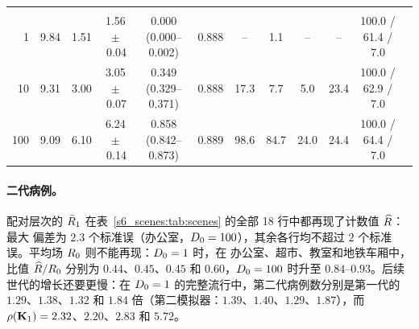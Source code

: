 \begin{table}[tbp]
\begin{tabular}{@{}rccccccccccc@{}}
\addlinespace
\multicolumn{12}{@{}l}{\emph{地铁车厢}，$\Npop=310$，$\ncell=270$，同格接触核；$\beta\langle q\rangle/\gamma=9.06$，$\beta\qmax/\gamma=10.00$}\\
1 & 9.84 & 1.51 & 1.56\,$\pm$\,0.04 & 0.000 (0.000--0.002) & 0.888 & -- & 1.1 & -- & -- & 100.0 / 61.4 / 7.0 & \\
10 & 9.31 & 3.00 & 3.05\,$\pm$\,0.07 & 0.349 (0.329--0.371) & 0.888 & 17.3 & 7.7 & 5.0 & 23.4 & 100.0 / 62.9 / 7.0 & \\
100 & 9.09 & 6.10 & 6.24\,$\pm$\,0.14 & 0.858 (0.842--0.873) & 0.889 & 98.6 & 84.7 & 24.0 & 24.4 & 100.0 / 64.4 / 7.0 & \\
\bottomrule
\end{tabular}
\end{table}

\paragraph{二代病例。}配对层次的 $\bar{R}_1$ 在表~\ref{s6_scenes:tab:scenes} 的全部 18 行中都再现了计数值 $\widehat{R}$：最大
偏差为 $2.3$ 个标准误（办公室，$D_0=100$），其余各行均不超过 $2$ 个标准误。平均场 $R_0$ 则不能再现：$D_0=1$ 时，在
办公室、超市、教室和地铁车厢中，比值 $\widehat{R}/R_0$ 分别为 $0.44$、$0.45$、$0.45$ 和 $0.60$，$D_0=100$ 时升至
$0.84$--$0.93$。后续世代的增长还要更慢：在 $D_0=1$ 的完整流行中，第二代病例数分别是第一代的 $1.29$、$1.38$、$1.32$ 和
$1.84$ 倍（第二模拟器：$1.39$、$1.40$、$1.29$、$1.87$），而 $\rho(\mathbf{K}_1)=2.32$、$2.20$、$2.83$ 和 $5.72$。

